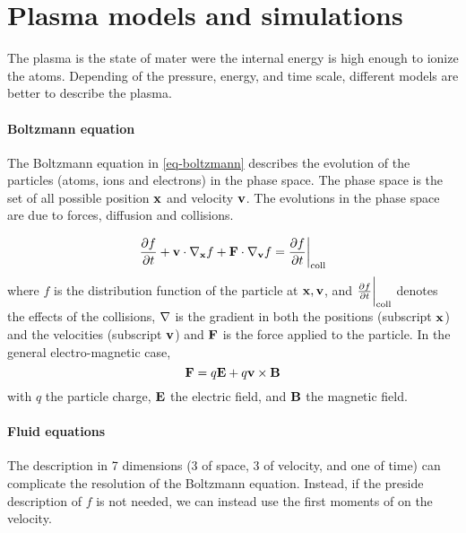 

\section*{Plasma models and simulations}
\label{sec-simulations}

The plasma is the state of mater were the internal energy is high enough to ionize the atoms.
Depending of the pressure, energy, and time scale, different models are better to describe the plasma.

\paragraph{Boltzmann equation \\}
The Boltzmann equation in \cref{eq-boltzmann} describes the evolution of the particles (atoms, ions and electrons) in the phase space.
The phase space is the set of all possible position ${\mathbf x}$ and velocity ${\mathbf v}$.
The evolutions in the phase space are due to forces, diffusion and collisions.

\begin{equation} \label{eq-boltzmann}
\frac{\partial f}{\partial t}  + {\mathbf v} \cdot {\mathbf \nabla}_{{\mathbf x}} f + {\mathbf F} \cdot  {\mathbf \nabla}_{{\mathbf v}} f = \frac{\partial f}{\partial t}  \bigg\vert_{\rm coll} 
\end{equation}
where $f$ is the distribution function of the particle at ${\mathbf x}, {\mathbf v}$, and $\frac{\partial f}{\partial t}  \bigg\vert_{\rm coll} $ denotes the effects of the collisions, ${\mathbf \nabla}$ is the gradient in both the positions (subscript ${\mathbf x}$) and the velocities (subscript ${\mathbf v}$)  and ${\mathbf F}$ is the force applied to the particle.
In the general electro-magnetic case,
\begin{equation*} \label{eq-forceEM}
  {\mathbf F} =  q {\mathbf E} + q {\mathbf v} \times {\mathbf B}
\end{equation*}
with $q$ the particle charge, ${\mathbf E}$ the electric field, and ${\mathbf B}$ the magnetic field.

\paragraph{Fluid equations \\}
The description in 7 dimensions (3 of space, 3 of velocity, and one of time) can complicate the resolution of the Boltzmann equation.
Instead, if the preside description of $f$ is not needed, we can instead use the first moments of  on the velocity.

